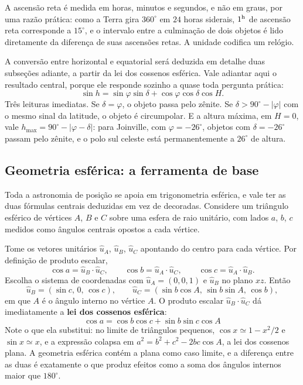 \documentclass[11pt,a4paper]{article}
\begin{document}
A ascensão reta é medida em horas, minutos e segundos, e não em graus, por uma razão prática: como a Terra gira $360^\circ$ em $24$ horas siderais, $1^{\rm h}$ de ascensão reta corresponde a $15^\circ$, e o intervalo entre a culminação de dois objetos é lido diretamente da diferença de suas ascensões retas. A unidade codifica um relógio.

A conversão entre horizontal e equatorial será deduzida em detalhe duas subseções adiante, a partir da lei dos cossenos esférica. Vale adiantar aqui o resultado central, porque ele responde sozinho a quase toda pergunta prática:
\[
\sin h=\sin\varphi\sin\delta+\cos\varphi\cos\delta\cos H.
\]
Três leituras imediatas. Se $\delta=\varphi$, o objeto passa pelo zênite. Se $\delta>90^\circ-|\varphi|$ com o mesmo sinal da latitude, o objeto é circumpolar. E a altura máxima, em $H=0$, vale $h_{\max}=90^\circ-|\varphi-\delta|$: para Joinville, com $\varphi=-26^\circ$, objetos com $\delta=-26^\circ$ passam pelo zênite, e o polo sul celeste está permanentemente a $26^\circ$ de altura.

\subsection*{Geometria esférica: a ferramenta de base}

Toda a astronomia de posição se apoia em trigonometria esférica, e vale ter as duas fórmulas centrais deduzidas em vez de decoradas. Considere um triângulo esférico de vértices $A$, $B$ e $C$ sobre uma esfera de raio unitário, com lados $a$, $b$, $c$ medidos como ângulos centrais opostos a cada vértice.

Tome os vetores unitários $\hat{u}_A$, $\hat{u}_B$, $\hat{u}_C$ apontando do centro para cada vértice. Por definição de produto escalar,
\[
\cos a=\hat{u}_B\cdot\hat{u}_C,\qquad
\cos b=\hat{u}_A\cdot\hat{u}_C,\qquad
\cos c=\hat{u}_A\cdot\hat{u}_B.
\]
Escolha o sistema de coordenadas com $\hat{u}_A=(0,0,1)$ e $\hat{u}_B$ no plano $xz$. Então
\[
\hat{u}_B=(\sin c,\,0,\,\cos c),\qquad
\hat{u}_C=(\sin b\cos A,\,\sin b\sin A,\,\cos b),
\]
em que $A$ é o ângulo interno no vértice $A$. O produto escalar $\hat{u}_B\cdot\hat{u}_C$ dá imediatamente a \textbf{lei dos cossenos esférica}:
\[
\boxed{\ \cos a=\cos b\cos c+\sin b\sin c\cos A\ }
\]
Note o que ela substitui: no limite de triângulos pequenos, $\cos x\simeq1-x^2/2$ e $\sin x\simeq x$, e a expressão colapsa em $a^2=b^2+c^2-2bc\cos A$, a lei dos cossenos plana. A geometria esférica contém a plana como caso limite, e a diferença entre as duas é exatamente o que produz efeitos como a soma dos ângulos internos maior que $180^\circ$.
\end{document}

